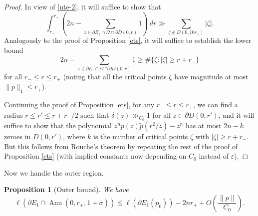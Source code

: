 \documentclass[12pt]{amsart}
\newtheorem{proposition}[theorem]{Proposition}
\newcommand{\eps}{\varepsilon}
\newcommand{\Ann}{\operatorname{Ann}}
\begin{document}
\begin{proof}
In view of \eqref{ute-2}, it will suffice to show that
$$ \int_{r_-}^{r_+} \left(2n - \sum_{z \in \partial E_1 \cap \Omega \cap \partial D(0,r)} 1\right)\ dr \gg \sum_{\zeta \notin D(0,10r_-)} |\zeta|.$$
Analogously to the proof of Proposition \ref{ets}, it will suffice to establish the lower bound
$$ 2n - \sum_{z \in \partial E_1 \cap \Omega \cap \partial D(0,r)} 1 \geq \# \{ \zeta: |\zeta| \geq r + r_- \}$$
for all $r_- \leq r \leq r_+$ (noting that all the critical points $\zeta$ have magnitude at most $\|p\|_1 \leq r_+$).

Continuing the proof of Proposition \ref{ets}, for any $r_- \leq r \leq r_+$, we can find a radius $r \leq r' \leq r+r_-/2$ such that $\delta(z) \gg_{C_0} 1$ for all $z \in \partial D(0,r')$, and it will suffice to show that the polynomial $z^n p(z) \tilde p(r^2/z) - z^n$ has at most $2n - k$ zeroes in $D(0,r')$, where $k$ is the number of critical points $\zeta$ with $|\zeta| \geq r + r_-$.  But this follows from Rouche's theorem by repeating the rest of the proof of Proposition \ref{ets} (with implied constants now depending on $C_0$ instead of $\eps$).
\end{proof}

Now we handle the outer region.

\begin{proposition}[Outer bound]\label{outside-again}  We have
    $$ \ell(\partial E_1 \cap \Ann(0,r_+,1+\sigma)) \leq \ell(\partial E_1(p_0)) - 2nr_+ + O\left( \frac{\|p\|}{C_0} \right).$$
\end{proposition}
\end{document}
